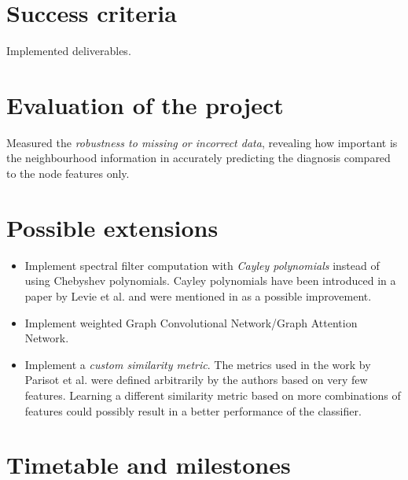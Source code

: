 \documentclass[12pt,a4paper,twoside]{article}
\begin{document}
\section*{Success criteria}
Implemented deliverables.

\section*{Evaluation of the project}
Measured the \textit{robustness to missing or incorrect data}, revealing how important is the neighbourhood information in accurately predicting the diagnosis compared to the node features only.

\section*{Possible extensions}
\begin{itemize}
  \item Implement spectral filter computation with \textit{Cayley polynomials} instead of using Chebyshev polynomials. Cayley polynomials have been introduced in a paper by Levie et al. \cite{levie2017cayleynets} and were mentioned in \cite{parisot2018disease} as a possible improvement.
  \item Implement weighted Graph Convolutional Network/Graph Attention Network.
  \item Implement a \textit{custom similarity metric}. The metrics used in the work by Parisot et al. \cite{parisot2018disease} were defined arbitrarily by the authors based on very few features. Learning a different similarity metric based on more combinations of features could possibly result in a better performance of the classifier.
\end{itemize}


\section*{Timetable and milestones}
\label{section:timetable}


\end{document}
